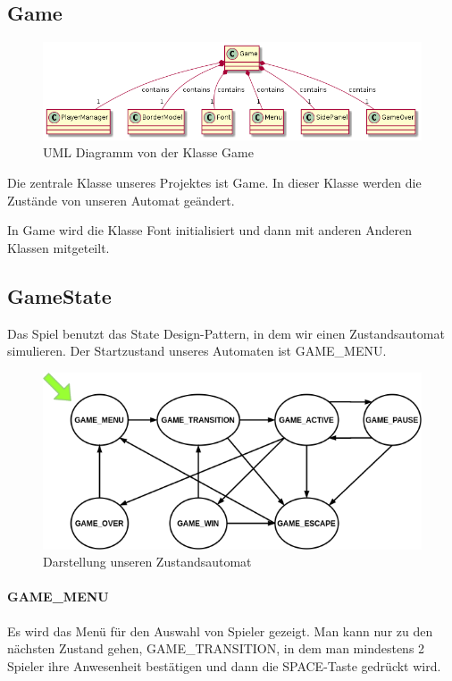 \documentclass[doktyp=studarbeit]{TUBAFarbeiten}
\begin{document}
\subsection{Game}

\begin{figure}
    \centering
    \includegraphics[width=0.9\linewidth]{Game.png}
	\caption{UML Diagramm von der Klasse Game}
	\label{fig:game-uml}
\end{figure}

Die zentrale Klasse unseres Projektes ist Game. In dieser Klasse werden die 
Zustände von unseren Automat geändert. 

In Game wird die Klasse Font initialisiert und dann mit anderen Anderen Klassen 
mitgeteilt.

\subsection{GameState}

Das Spiel benutzt das State Design-Pattern, in dem wir einen Zustandsautomat
simulieren. Der Startzustand unseres Automaten ist GAME\_MENU. 

\begin{figure}
    \centering
    \includegraphics[width=0.7\linewidth]{state_machine.png}
	\caption{Darstellung unseren Zustandsautomat}
	\label{fig:state-machine}
\end{figure}

\paragraph{GAME\_MENU}
Es wird das Menü für den Auswahl von Spieler gezeigt. Man kann nur zu den
nächsten Zustand gehen, GAME\_TRANSITION, in dem man mindestens 2 Spieler
ihre Anwesenheit bestätigen und dann die SPACE-Taste gedrückt wird.
\end{document}
